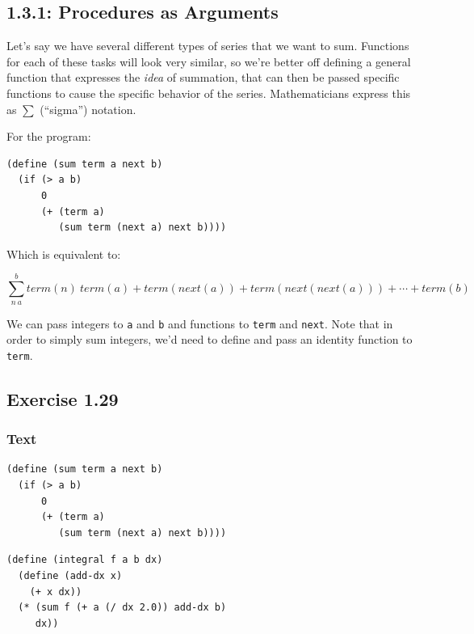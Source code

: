 \documentclass[final,fleqn,titlepage,twoside]{article}
\begin{document}
\subsection{1.3.1: Procedures as Arguments}
\label{sec:org7d083db}
Let's say we have several different types of series that we want to sum.
Functions for each of these tasks will look very similar, so we're better off
defining a general function that expresses the \emph{idea} of summation, that can
then be passed specific functions to cause the specific behavior of the series.
Mathematicians express this as \(\sum\) (``sigma'') notation.

For the program:

\begin{verbatim}
(define (sum term a next b)
  (if (> a b)
      0
      (+ (term a)
         (sum term (next a) next b))))
\end{verbatim}

Which is equivalent to:

\[\sum^{b}_{n~a}term(n)~term(a)+term(next(a))+term(next(next(a)))+\cdots+term(b)\]

We can pass integers to \texttt{a} and \texttt{b} and functions to
\texttt{term} and \texttt{next}. Note that in order to simply sum
integers, we'd need to define and pass an identity function to \texttt{term}.

\subsection{Exercise 1.29}
\label{sec:org4d20e55}
\subsubsection{Text}
\label{sec:org43dc8b3}
\begin{verbatim}
(define (sum term a next b)
  (if (> a b)
      0
      (+ (term a)
         (sum term (next a) next b))))
\end{verbatim}
\begin{verbatim}
(define (integral f a b dx)
  (define (add-dx x)
    (+ x dx))
  (* (sum f (+ a (/ dx 2.0)) add-dx b)
     dx))
\end{verbatim}
\end{document}
